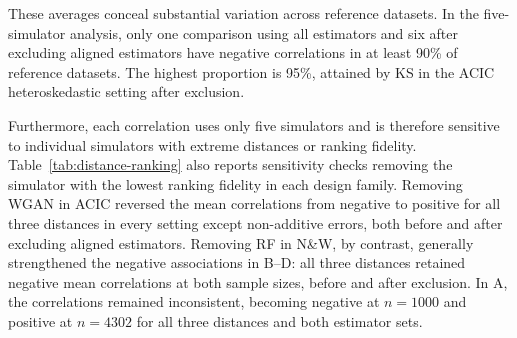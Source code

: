 These averages conceal substantial variation across reference datasets. In the five-simulator analysis, only one comparison using all estimators and six after excluding aligned estimators have negative correlations in at least 90\% of reference datasets. The highest proportion is 95\%, attained by KS in the ACIC heteroskedastic setting after exclusion.

Furthermore, each correlation uses only five simulators and is therefore sensitive to individual simulators with extreme distances or ranking fidelity. Table~\ref{tab:distance-ranking} also reports sensitivity checks removing the simulator with the lowest ranking fidelity in each design family. Removing WGAN in ACIC reversed the mean correlations from negative to positive for all three distances in every setting except non-additive errors, both before and after excluding aligned estimators. Removing RF in N\&W, by contrast, generally strengthened the negative associations in B--D: all three distances retained negative mean correlations at both sample sizes, before and after exclusion. In A, the correlations remained inconsistent, becoming negative at \(n=1000\) and positive at \(n=4302\) for all three distances and both estimator sets.
